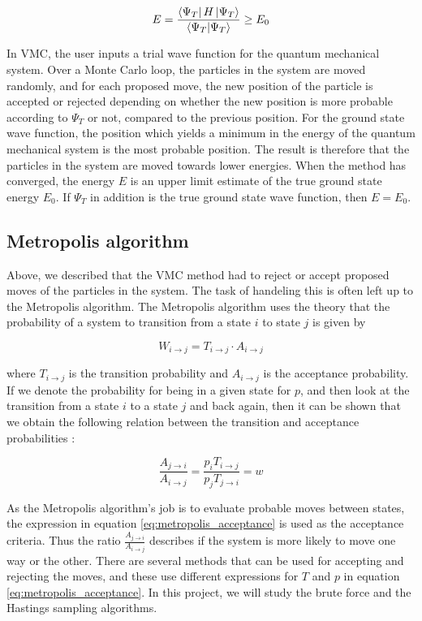 \documentclass[norsk,a4paper,12pt]{article}
\begin{document}
\begin{equation}
	\label{eq:variational_method}
	E = \frac{\bra{\Psi_T}H \ket{\Psi_T}}{\braket{\Psi_T}} \geq E_0
\end{equation} 

In VMC, the user inputs a trial wave function for the quantum mechanical system. Over a Monte Carlo loop, the particles in the system are moved randomly, and for each proposed move, the new position of the particle is accepted or rejected depending on whether the new position is more probable according to $\Psi_T$ or not, compared to the previous position. For the ground state wave function, the position which yields a minimum in the energy of the quantum mechanical system is the most probable position. The result is therefore that the particles in the system are moved towards lower energies. When the method has converged, the energy $E$ is an upper limit estimate of the true ground state energy $E_0$. If $\Psi_T$ in addition is the true ground state wave function, then $E=E_0$. 

\subsection{Metropolis algorithm}
Above, we described that the VMC method had to reject or accept proposed moves of the particles in the system. The task of handeling this is often left up to the Metropolis algorithm. The Metropolis algorithm uses the theory that the probability of a system to transition from a state $i$ to state $j$ is given by

\begin{equation}
W_{i\rightarrow j} = T_{i \rightarrow j}\cdot A_{i \rightarrow j}
\end{equation}

where $T_{i \rightarrow j}$ is the transition probability and $A_{i \rightarrow j}$ is the acceptance probability. If we denote the probability for being in a given state for $p$, and then look at the transition from a state $i$ to a state $j$ and back again, then it can be shown that we obtain the following relation between the transition and acceptance probabilities \cite{Nordhagen}:

\begin{equation}
\label{eq:metropolis_acceptance}
\frac{A_{j\rightarrow i}}{A_{i\rightarrow j}}=\frac{p_iT_{i\rightarrow j}}{p_jT_{j\rightarrow i}} = w
\end{equation}

As the Metropolis algorithm's job is to evaluate probable moves between states, the expression in equation \ref{eq:metropolis_acceptance} is used as the acceptance criteria. Thus the ratio $\frac{A_{j\rightarrow i}}{A_{i\rightarrow j}}$ describes if the system is more likely to move one way or the other. There are several methods that can be used for accepting and rejecting the moves, and these use different expressions for $T$ and $p$ in equation \ref{eq:metropolis_acceptance}. In this project, we will study the brute force and the Hastings sampling algorithms.
\end{document}
